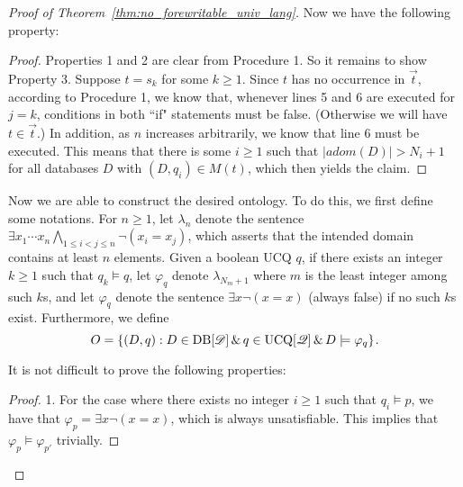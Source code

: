 \documentclass[letterpaper]{article} %
\theoremstyle{definition}
\theoremstyle{remark}
\theoremstyle{definition}
\begin{document}
\begin{proof}[Proof of Theorem~\ref{thm:no_forewritable_univ_lang}]
Now we have the following property:

\medskip
{}

\begin{proof}
Properties 1 and 2 are clear from Procedure 1. So it remains to show Property 3.
Suppose $t=s_k$ for some $k\ge 1$. Since $t$ has no occurrence in $\vec{t}$, according to Procedure 1, we know that, whenever lines 5 and 6 are executed  for $j=k$, conditions in both ``if" statements must be false. (Otherwise we will have $t\in\vec{t}$.) In addition, as $n$ increases arbitrarily, we know that line 6 must be executed. This means that there is some  $i\ge 1$ such that $|adom(D)|>N_i+1$ for all databases $D$ with $(D,q_i)\in M(t)$, which then yields the claim.  
\end{proof}


Now we are able to construct the desired ontology. To do this, we first define some notations. For $n\ge 1$, let $\lambda_n$ denote the sentence $\exists x_1\cdots x_n\bigwedge_{1\le i<j\le n}\neg(x_i=x_j)$, which asserts that the intended domain contains at least $n$ elements. Given a boolean UCQ $q$, if there exists an integer $k\ge 1$ such that $q_k\vDash q$, let $\varphi_q$ denote $\lambda_{N_m+1}$ where $m$ is the least integer among such $k$s, and let $\varphi_q$ denote the sentence $\exists x\neg(x=x)$ (always false) if no such $k$s exist. Furthermore, we define
\begin{equation*}
O=\left\{(D,{q}):D\in\text{DB}[\mathscr{D}]\,\&\,q\in\text{UCQ}[\mathscr{Q}]\,\&\,D\models\varphi_q\right\}\hspace{-.03cm}.
\end{equation*}

It is not difficult to prove the following properties:

\medskip
{}


\begin{proof}
1. For the case where there exists no integer $i\ge 1$ such that $q_i\vDash p$, we have that $\varphi_p=\exists x\neg (x=x)$, which is always unsatisfiable. This implies that $\varphi_p\vDash\varphi_{p'}$ trivially. 


\end{proof}
\end{proof}
\end{document}
